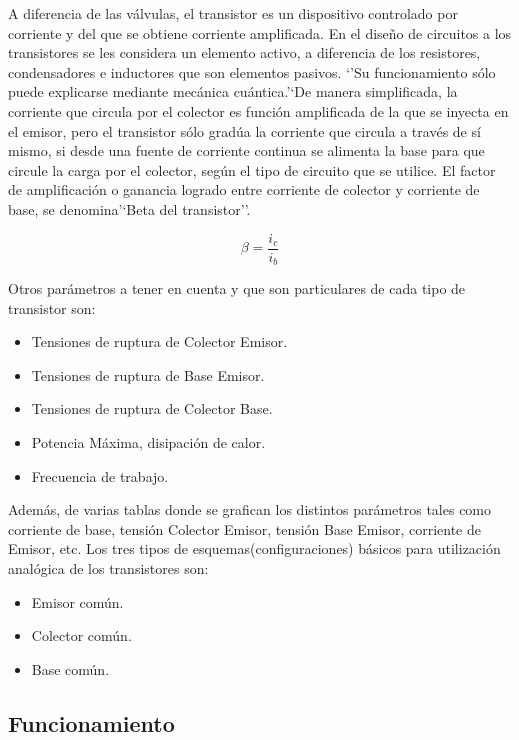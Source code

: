 \documentclass{article}
\begin{document}
A diferencia de las válvulas, el transistor es un dispositivo controlado
por corriente y del que se obtiene corriente amplificada. En el diseño
de circuitos a los transistores se les considera un elemento activo, a
diferencia de los resistores, condensadores e inductores que son
elementos pasivos. `'Su funcionamiento sólo puede explicarse mediante
mecánica cuántica.'`De manera simplificada, la corriente que circula por
el colector es función amplificada de la que se inyecta en el emisor,
pero el transistor sólo gradúa la corriente que circula a través de sí
mismo, si desde una fuente de corriente continua se alimenta la base
para que circule la carga por el colector, según el tipo de circuito que
se utilice. El factor de amplificación o ganancia logrado entre
corriente de colector y corriente de base, se denomina'`Beta del
transistor''.

\begin{equation}\label{eq:b}
\beta = \frac{i_{c}}{i_{b}}
\end{equation}

Otros parámetros a tener en cuenta y que son particulares de cada tipo
de transistor son:

\begin{itemize}
\itemsep1pt\parskip0pt
\item
  Tensiones de ruptura de Colector Emisor.
\item
  Tensiones de ruptura de Base Emisor.
\item
  Tensiones de ruptura de Colector Base.
\item
  Potencia Máxima, disipación de calor.
\item
  Frecuencia de trabajo.
\end{itemize}

Además, de varias tablas donde se grafican los distintos parámetros
tales como corriente de base, tensión Colector Emisor, tensión Base
Emisor, corriente de Emisor, etc. Los tres tipos de
esquemas(configuraciones) básicos para utilización analógica de los
transistores son:

\begin{itemize}
\itemsep1pt\parskip0pt
\item
  Emisor común.
\item
  Colector común.
\item
  Base común.
\end{itemize}

\subsection{Funcionamiento}\label{funcionamiento}
\end{document}
